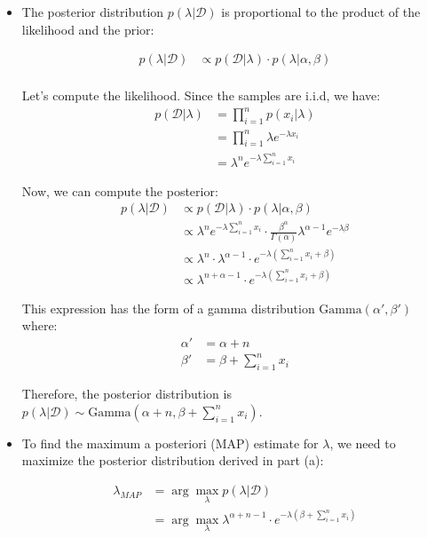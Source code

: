 \begin{itemize}
\item[(a)] The posterior distribution $p(\lambda|\mathcal{D})$ is proportional to the product of the likelihood and the prior:

\begin{align*}
p(\lambda|\mathcal{D}) &\propto p(\mathcal{D}|\lambda) \cdot p(\lambda|\alpha,\beta)\\
\end{align*}

Let's compute the likelihood. Since the samples are i.i.d, we have:
\begin{align*}
p(\mathcal{D}|\lambda) &= \prod_{i=1}^n p(x_i|\lambda)\\
&= \prod_{i=1}^n \lambda e^{-\lambda x_i}\\
&= \lambda^n e^{-\lambda \sum_{i=1}^n x_i}
\end{align*}

Now, we can compute the posterior:
\begin{align*}
p(\lambda|\mathcal{D}) &\propto p(\mathcal{D}|\lambda) \cdot p(\lambda|\alpha,\beta)\\
&\propto \lambda^n e^{-\lambda \sum_{i=1}^n x_i} \cdot \frac{\beta^\alpha}{\Gamma(\alpha)}\lambda^{\alpha-1}e^{-\lambda\beta}\\
&\propto \lambda^n \cdot \lambda^{\alpha-1} \cdot e^{-\lambda(\sum_{i=1}^n x_i + \beta)}\\
&\propto \lambda^{n+\alpha-1} \cdot e^{-\lambda(\sum_{i=1}^n x_i + \beta)}
\end{align*}

This expression has the form of a gamma distribution $\text{Gamma}(\alpha', \beta')$ where:
\begin{align*}
\alpha' &= \alpha + n\\
\beta' &= \beta + \sum_{i=1}^n x_i
\end{align*}

Therefore, the posterior distribution is $p(\lambda|\mathcal{D}) \sim \text{Gamma}(\alpha + n, \beta + \sum_{i=1}^n x_i)$.

\item[(b)] To find the maximum a posteriori (MAP) estimate for $\lambda$, we need to maximize the posterior distribution derived in part (a):

\begin{align*}
\lambda_{MAP} &= \arg\max_{\lambda} p(\lambda|\mathcal{D})\\
&= \arg\max_{\lambda} \lambda^{\alpha+n-1} \cdot e^{-\lambda(\beta + \sum_{i=1}^n x_i)}
\end{align*}


\end{itemize}
